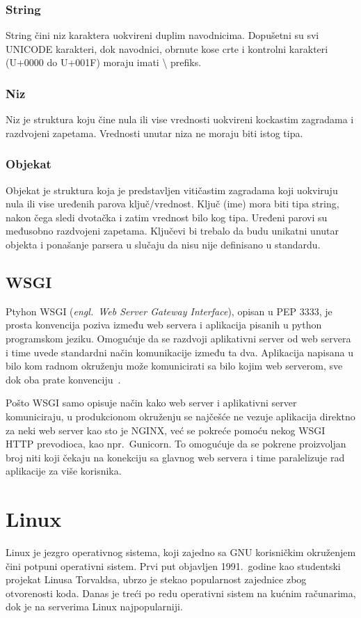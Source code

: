 \documentclass[12pt]{report}
\begin{document}
\subsubsection{String}
String čini niz karaktera uokvireni duplim navodnicima. Dopušetni su svi UNICODE karakteri, dok navodnici, obrnute kose crte i kontrolni karakteri (U+0000 do U+001F) moraju imati \textbackslash{} prefiks.

\subsubsection{Niz}
Niz je struktura koju čine nula ili vise vrednosti uokvireni kockastim zagradama i razdvojeni zapetama. Vrednosti unutar niza ne moraju biti istog tipa.

\subsubsection{Objekat}
Objekat je struktura koja je predstavljen vitičastim zagradama koji uokviruju nula ili vise uređenih parova ključ/vrednost. Ključ (ime) mora biti tipa string, nakon čega sledi dvotačka i zatim vrednost bilo kog tipa. Uređeni parovi su međusobno razdvojeni zapetama. Ključevi bi trebalo da budu unikatni unutar objekta i ponašanje parsera u slučaju da nisu nije definisano u standardu.

\subsection{WSGI}
Ptyhon \acrshort{WSGI} (\textit{engl.\ Web Server Gateway Interface}), opisan u PEP 3333, je prosta konvencija poziva između web servera i aplikacija pisanih u python programskom jeziku. Omogućuje da se razdvoji aplikativni server od web servera i time uvede standardni način komunikacije između ta dva. Aplikacija napisana u bilo kom radnom okruženju može komunicirati sa bilo kojim web serverom, sve dok oba prate konvenciju~\cite{wsgi}.

Pošto \acrshort{WSGI} samo opisuje način kako web server i aplikativni server komuniciraju, u produkcionom okruženju se najčešće ne vezuje aplikacija direktno za neki web server kao sto je NGINX, već se pokreće pomoću nekog \acrshort{WSGI} \acrshort{HTTP} prevodioca, kao npr.\ Gunicorn. To omogućuje da se pokrene proizvoljan broj niti koji čekaju na konekciju sa glavnog web servera i time paralelizuje rad aplikacije za više korisnika.

\section{Linux}
Linux je jezgro operativnog sistema, koji zajedno sa GNU korisničkim okruženjem čini potpuni operativni sistem. Prvi put objavljen 1991.\ godine kao studentski projekat Linusa Torvaldsa, ubrzo je stekao popularnost zajednice zbog otvorenosti koda. Danas je treći po redu operativni sistem na kućnim računarima, dok je na serverima Linux najpopularniji.
\end{document}
